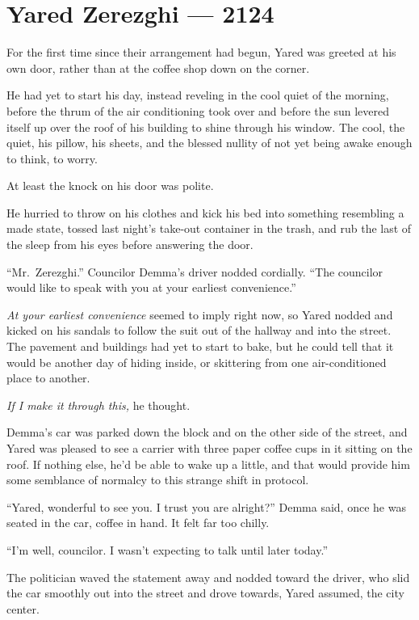\hypertarget{yared-zerezghi-2124}{%
\chapter{Yared Zerezghi — 2124}\label{yared-zerezghi-2124}}

For the first time since their arrangement had begun, Yared was greeted at his own door, rather than at the coffee shop down on the corner.

He had yet to start his day, instead reveling in the cool quiet of the morning, before the thrum of the air conditioning took over and before the sun levered itself up over the roof of his building to shine through his window. The cool, the quiet, his pillow, his sheets, and the blessed nullity of not yet being awake enough to think, to worry.

At least the knock on his door was polite.

He hurried to throw on his clothes and kick his bed into something resembling a made state, tossed last night's take-out container in the trash, and rub the last of the sleep from his eyes before answering the door.

``Mr.~Zerezghi.'' Councilor Demma's driver nodded cordially. ``The councilor would like to speak with you at your earliest convenience.''

\emph{At your earliest convenience} seemed to imply right now, so Yared nodded and kicked on his sandals to follow the suit out of the hallway and into the street. The pavement and buildings had yet to start to bake, but he could tell that it would be another day of hiding inside, or skittering from one air-conditioned place to another.

\emph{If I make it through this,} he thought.

Demma's car was parked down the block and on the other side of the street, and Yared was pleased to see a carrier with three paper coffee cups in it sitting on the roof. If nothing else, he'd be able to wake up a little, and that would provide him some semblance of normalcy to this strange shift in protocol.

``Yared, wonderful to see you. I trust you are alright?'' Demma said, once he was seated in the car, coffee in hand. It felt far too chilly.

``I'm well, councilor. I wasn't expecting to talk until later today.''

The politician waved the statement away and nodded toward the driver, who slid the car smoothly out into the street and drove towards, Yared assumed, the city center.

